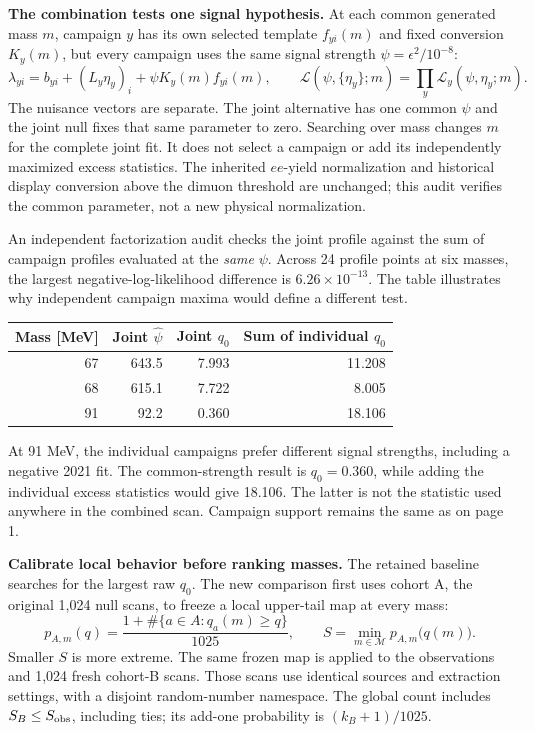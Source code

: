 \documentclass[11pt]{article}
\begin{document}
\textbf{The combination tests one signal hypothesis.} At each common generated mass $m$, campaign $y$ has its own selected template $f_{yi}(m)$ and fixed conversion $K_y(m)$, but every campaign uses the same signal strength $\psi=\epsilon^2/10^{-8}$:
\[
 \lambda_{yi}=b_{yi}+(L_y\eta_y)_i+\psi K_y(m)f_{yi}(m),\qquad
 \mathcal L(\psi,\{\eta_y\};m)=\prod_y\mathcal L_y(\psi,\eta_y;m).
\]
The nuisance vectors are separate. The joint alternative has one common $\psi$ and the joint null fixes that same parameter to zero. Searching over mass changes $m$ for the complete joint fit. It does not select a campaign or add its independently maximized excess statistics. The inherited $ee$-yield normalization and historical display conversion above the dimuon threshold are unchanged; this audit verifies the common parameter, not a new physical normalization.

An independent factorization audit checks the joint profile against the sum of campaign profiles evaluated at the \emph{same} $\psi$. Across 24 profile points at six masses, the largest negative-log-likelihood difference is $6.26\times10^{-13}$. The table illustrates why independent campaign maxima would define a different test.
\begin{center}\small\begin{tabular}{rrrr}\toprule
Mass [MeV] & Joint $\widehat\psi$ & Joint $q_0$ & Sum of individual $q_0$\\\midrule
67 & 643.5 & 7.993 & 11.208\\
68 & 615.1 & 7.722 & 8.005\\
91 & 92.2 & 0.360 & 18.106\\
\bottomrule\end{tabular}\end{center}
At 91 MeV, the individual campaigns prefer different signal strengths, including a negative 2021 fit. The common-strength result is $q_0=0.360$, while adding the individual excess statistics would give 18.106. The latter is not the statistic used anywhere in the combined scan. Campaign support remains the same as on page 1.

\textbf{Calibrate local behavior before ranking masses.} The retained baseline searches for the largest raw $q_0$. The new comparison first uses cohort A, the original 1,024 null scans, to freeze a local upper-tail map at every mass:
\[
 p_{A,m}(q)=\frac{1+\#\{a\in A:q_a(m)\ge q\}}{1025},
 \qquad S=\min_{m\in\mathcal M}p_{A,m}\bigl(q(m)\bigr).
\]
Smaller $S$ is more extreme. The same frozen map is applied to the observations and 1,024 fresh cohort-B scans. Those scans use identical sources and extraction settings, with a disjoint random-number namespace. The global count includes $S_B\le S_{\rm obs}$, including ties; its add-one probability is $(k_B+1)/1025$.
\end{document}
